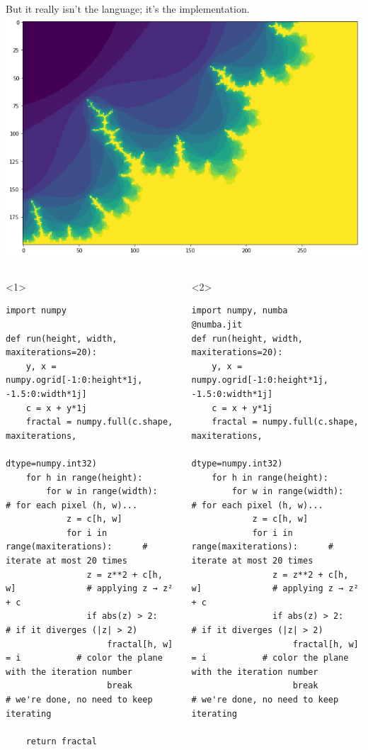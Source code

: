 \documentclass[aspectratio=169]{beamer}
\begin{document}
\begin{frame}[fragile]{But it really isn't the language; it's the implementation.}
\vspace{0.5 cm}
\hfill\mbox{\includegraphics[height=3 cm]{performance-test-fractal.png}\hspace{-0.25 cm}}

\vspace{-2.5 cm}
\scriptsize
\begin{columns}
\begin{onlyenv}<1>
\begin{verbatim}
import numpy

def run(height, width, maxiterations=20):
    y, x = numpy.ogrid[-1:0:height*1j, -1.5:0:width*1j]
    c = x + y*1j
    fractal = numpy.full(c.shape, maxiterations,
                                  dtype=numpy.int32)
    for h in range(height):
        for w in range(width):                  # for each pixel (h, w)...
            z = c[h, w]
            for i in range(maxiterations):      # iterate at most 20 times
                z = z**2 + c[h, w]              # applying z → z² + c
                if abs(z) > 2:                  # if it diverges (|z| > 2)
                    fractal[h, w] = i           # color the plane with the iteration number
                    break                       # we're done, no need to keep iterating

    return fractal
\end{verbatim}
\end{onlyenv}
\begin{onlyenv}<2>
\begin{verbatim}
import numpy, numba
@numba.jit
def run(height, width, maxiterations=20):
    y, x = numpy.ogrid[-1:0:height*1j, -1.5:0:width*1j]
    c = x + y*1j
    fractal = numpy.full(c.shape, maxiterations,
                                  dtype=numpy.int32)
    for h in range(height):
        for w in range(width):                  # for each pixel (h, w)...
            z = c[h, w]
            for i in range(maxiterations):      # iterate at most 20 times
                z = z**2 + c[h, w]              # applying z → z² + c
                if abs(z) > 2:                  # if it diverges (|z| > 2)
                    fractal[h, w] = i           # color the plane with the iteration number
                    break                       # we're done, no need to keep iterating


\end{verbatim}
\end{onlyenv}
\end{columns}
\end{frame}
\end{document}
